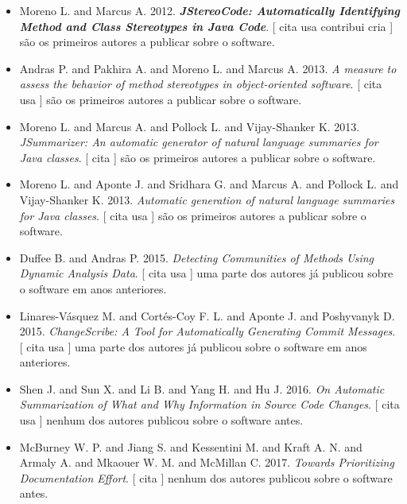 \begin{itemize}
\item Moreno L. and Marcus A.
      2012.
        \textbf{\textit{ JStereoCode: Automatically Identifying Method and Class Stereotypes in Java Code}}.
      [
          cita
          usa
          contribui
          cria
      ]
são os primeiros autores a publicar sobre o software.
\item Andras P. and Pakhira A. and Moreno L. and Marcus A.
      2013.
        \textit{ A measure to assess the behavior of method stereotypes in object-oriented software}.
      [
          cita
          usa
      ]
são os primeiros autores a publicar sobre o software.
\item Moreno L. and Marcus A. and Pollock L. and Vijay-Shanker K.
      2013.
        \textit{ JSummarizer: An automatic generator of natural language summaries for Java classes}.
      [
          cita
      ]
são os primeiros autores a publicar sobre o software.
\item Moreno L. and Aponte J. and Sridhara G. and Marcus A. and Pollock L. and Vijay-Shanker K.
      2013.
        \textit{ Automatic generation of natural language summaries for Java classes}.
      [
          cita
          usa
      ]
são os primeiros autores a publicar sobre o software.
\item Duffee B. and Andras P.
      2015.
        \textit{ Detecting Communities of Methods Using Dynamic Analysis Data}.
      [
          cita
          usa
      ]
uma parte dos autores já publicou sobre o software em anos anteriores.
\item Linares-V\'{a}squez M. and Cort{\'e}s-Coy F. L. and Aponte J. and Poshyvanyk D.
      2015.
        \textit{ ChangeScribe: A Tool for Automatically Generating Commit Messages}.
      [
          cita
          usa
      ]
uma parte dos autores já publicou sobre o software em anos anteriores.
\item Shen J. and Sun X. and Li B. and Yang H. and Hu J.
      2016.
        \textit{ On Automatic Summarization of What and Why Information in Source Code Changes}.
      [
          cita
          usa
      ]
nenhum dos autores publicou sobre o software antes.
\item McBurney W. P. and Jiang S. and Kessentini M. and Kraft A. N. and Armaly A. and Mkaouer W. M. and McMillan C.
      2017.
        \textit{ Towards Prioritizing Documentation Effort}.
      [
          cita
      ]
nenhum dos autores publicou sobre o software antes.
\end{itemize}
